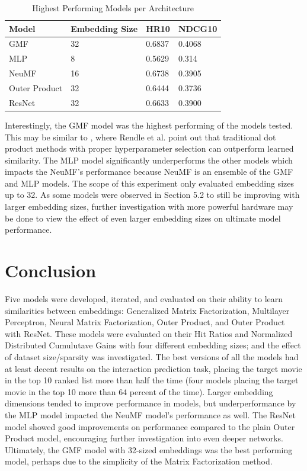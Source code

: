 \documentclass{article}
\begin{document}
\begin{table}[h]
\caption{Highest Performing Models per Architecture}
\centering
\begin{tabular}{llll}
\toprule
Model & Embedding Size & HR10 & NDCG10 \\
\midrule
GMF & 32 & 0.6837 & 0.4068 \\
MLP & 8 & 0.5629 & 0.314 \\
NeuMF & 16 & 0.6738 & 0.3905 \\
Outer Product & 32 & 0.6444 & 0.3736 \\
ResNet & 32 & 0.6633 & 0.3900 \\
\bottomrule
\end{tabular}
\label{tab:table6}
\end{table}

Interestingly, the GMF model was the highest performing of the models tested. This may be similar to \cite{rendle2020neural}, where Rendle et al. point out that traditional dot product methods with proper hyperparameter selection can outperform learned similarity. The MLP model significantly underperforms the other models which impacts the NeuMF's performance because NeuMF is an ensemble of the GMF and MLP models. The scope of this experiment only evaluated embedding sizes up to 32. As some models were observed in Section 5.2 to still be improving with larger embedding sizes, further investigation with more powerful hardware may be done to view the effect of even larger embedding sizes on ultimate model performance.

\section{Conclusion}
Five models were developed, iterated, and evaluated on their ability to learn similarities between embeddings: Generalized Matrix Factorization, Multilayer Perceptron, Neural Matrix Factorization, Outer Product, and Outer Product with ResNet. These models were evaluated on their Hit Ratios and Normalized Distributed Cumulutave Gains with four different embedding sizes; and the effect of dataset size/sparsity was investigated. The best versions of all the models had at least decent results on the interaction prediction task, placing the target movie in the top 10 ranked list more than half the time (four models placing the target movie in the top 10 more than 64 percent of the time). Larger embedding dimensions tended to improve performance in models, but underperformance by the MLP model impacted the NeuMF model's performance as well. The ResNet model showed good improvements on performance compared to the plain Outer Product model, encouraging further investigation into even deeper networks. Ultimately, the GMF model with 32-sized embeddings was the best performing model, perhaps due to the simplicity of the Matrix Factorization method.


{}
\end{document}

